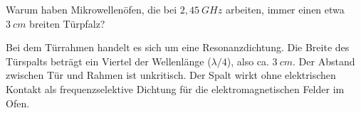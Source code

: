 \begin{question}[section=6,name={Mikrowellenofen},difficulty=,quantity=,type=thr,tags={20130724}]
	Warum haben Mikrowellenöfen, die bei $2,45~GHz$ arbeiten, immer einen etwa $3~cm$ breiten Türpfalz?
	
	
\end{question}
\begin{solution}
	Bei dem Türrahmen handelt es sich um eine Resonanzdichtung. Die Breite des Türspalts beträgt ein Viertel der Wellenlänge ($\lambda/4$), also ca. $3~cm$. Der Abstand zwischen Tür und Rahmen ist unkritisch. Der Spalt wirkt ohne elektrischen Kontakt als frequenzselektive Dichtung für die elektromagnetischen Felder im Ofen. 
\end{solution}